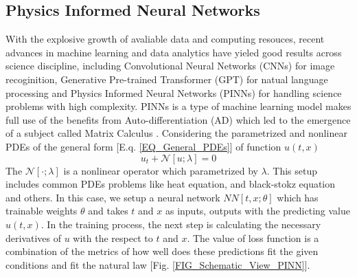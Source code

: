 \subsection{Physics Informed Neural Networks}\label{SEC:PINN}
With the explosive growth of avaliable data and computing resouces, 
recent advances in machine learning and data analytics have yieled good results across science discipline, 
including Convolutional Neural Networks (CNNs) \cite{CNN}
for image recoginition, 
Generative Pre-trained Transformer (GPT) \cite{GPT}
for natual language processing and 
Physics Informed Neural Networks (PINNs) \cite{PINN}
for handling science problems with high complexity.
PINNs is a type of machine learning model makes full use of the benefits from 
Auto-differentiation (AD) \cite{AD}
which led to the emergence of a subject called 
Matrix Calculus \cite{Matrix_Calculus}.
Considering the parametrized and nonlinear PDEs of the general form [E.q. \ref{EQ_General_PDEs}] of function $u(t,x)$
\begin{equation}\label{EQ_General_PDEs}
  u_t + \mathcal{N}\left[u;\lambda\right] = 0
\end{equation}
The $\mathcal{N}[\cdot;\lambda]$ is a nonlinear operator which parametrized by $\lambda$.
This setup includes common PDEs problems like heat equation, and black-stokz equation and others.
In this case, we setup a neural network $NN[t,x;\theta]$ which has trainable weights $\theta$ and takes 
$t$ and $x$ as inputs, outputs with the predicting value $\hat{u}(t,x)$.
In the training process, the next step is calculating the necessary derivatives of $u$ with the respect to $t$ and $x$.
The value of loss function is a combination of the metrics of how well does these predictions fit the given conditions and 
fit the natural law [Fig. \ref{FIG_Schematic_View_PINN}]. 



